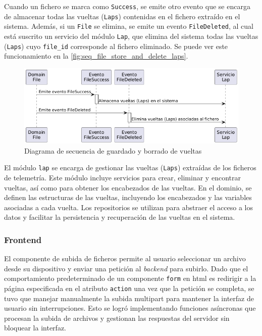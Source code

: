 Cuando un fichero se marca como \texttt{Success}, se emite otro evento que se encarga de almacenar todas las vueltas (\texttt{Laps}) contenidas en el fichero extraído en el sistema. Además, si un \texttt{File} se elimina, se emite un evento \texttt{FileDeleted}, al cual está suscrito un servicio del módulo \texttt{Lap}, que elimina del sistema todas las vueltas (\texttt{Laps}) cuyo \texttt{file\_id} corresponde al fichero eliminado. Se puede ver este funcionamiento en la \autoref{fig:seq_file_store_and_delete_laps}.

\begin{figure}[H]
\centering
\includegraphics[width=1\linewidth]{./figs/herramientas/desarrollo/seq_file_store_and_delete_laps.png}
\caption[Diagrama de secuencia de guardado y borrado de vueltas]{Diagrama de secuencia de guardado y borrado de vueltas}
\label{fig:seq_file_store_and_delete_laps}
\end{figure}

El módulo \texttt{lap} se encarga de gestionar las vueltas (\texttt{Laps}) extraídas de los ficheros de telemetría. Este módulo incluye servicios para crear, eliminar y encontrar vueltas, así como para obtener los encabezados de las vueltas. En el dominio, se definen las estructuras de las vueltas, incluyendo los encabezados y las variables asociadas a cada vuelta. Los repositorios se utilizan para abstraer el acceso a los datos y facilitar la persistencia y recuperación de las vueltas en el sistema.

\subsubsection*{Frontend}
El componente de subida de ficheros permite al usuario seleccionar un archivo desde su dispositivo y enviar una petición al \textit{backend} para subirlo. Dado que el comportamiento predeterminado de un componente \texttt{form} en \ac{html} es redirigir a la página especificada en el atributo \texttt{action} una vez que la petición se completa, se tuvo que manejar manualmente la subida multipart para mantener la interfaz de usuario sin interrupciones. Esto se logró implementando funciones asíncronas que procesan la subida de archivos y gestionan las respuestas del servidor sin bloquear la interfaz.


